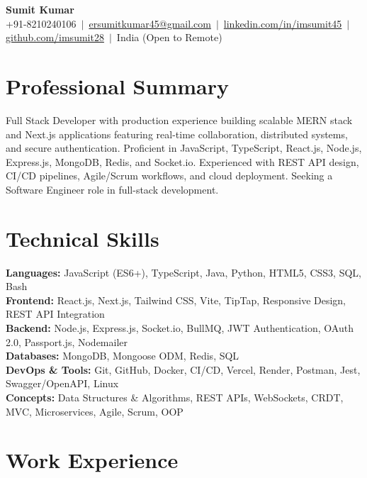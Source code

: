 \documentclass[10pt,letterpaper]{article}
\begin{document}
\begin{center}
  {\LARGE\bfseries Sumit Kumar}\\[3pt]
  \small
  +91-8210240106 \,$|$\,
  \href{mailto:ersumitkumar45@gmail.com}{ersumitkumar45@gmail.com} \,$|$\,
  \href{https://linkedin.com/in/imsumit45}{linkedin.com/in/imsumit45} \,$|$\,
  \href{https://github.com/imsumit28}{github.com/imsumit28} \,$|$\,
  India (Open to Remote)
\end{center}

\section{Professional Summary}
{\small Full Stack Developer with production experience building scalable MERN stack and Next.js applications featuring real-time collaboration, distributed systems, and secure authentication. Proficient in JavaScript, TypeScript, React.js, Node.js, Express.js, MongoDB, Redis, and Socket.io. Experienced with REST API design, CI/CD pipelines, Agile/Scrum workflows, and cloud deployment. Seeking a Software Engineer role in full-stack development.}

\section{Technical Skills}
{\small
\textbf{Languages:} JavaScript (ES6+), TypeScript, Java, Python, HTML5, CSS3, SQL, Bash \\[1.5pt]
\textbf{Frontend:} React.js, Next.js, Tailwind CSS, Vite, TipTap, Responsive Design, REST API Integration \\[1.5pt]
\textbf{Backend:} Node.js, Express.js, Socket.io, BullMQ, JWT Authentication, OAuth 2.0, Passport.js, Nodemailer \\[1.5pt]
\textbf{Databases:} MongoDB, Mongoose ODM, Redis, SQL \\[1.5pt]
\textbf{DevOps \& Tools:} Git, GitHub, Docker, CI/CD, Vercel, Render, Postman, Jest, Swagger/OpenAPI, Linux \\[1.5pt]
\textbf{Concepts:} Data Structures \& Algorithms, REST APIs, WebSockets, CRDT, MVC, Microservices, Agile, Scrum, OOP}

\section{Work Experience}
\end{document}
